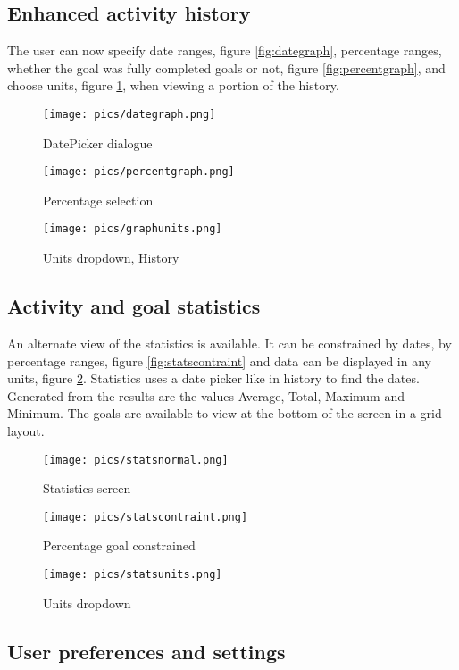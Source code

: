 \documentclass[12pt]{report}
\begin{document}
\subsection{Enhanced activity history}

The user can now specify date ranges, figure \ref{fig:dategraph}, percentage ranges, whether the goal was fully completed goals or not, figure \ref{fig:percentgraph}, and choose units, figure \ref{fig:graphunits}, when viewing a portion of the history. 

\begin{figure}[!htb]
  \texttt{[image: pics/dategraph.png]}
  \caption{DatePicker dialogue}
  \label{fig:dategraph}
\endminipage\hfill
{}
  \texttt{[image: pics/percentgraph.png]}
  \caption{Percentage selection}\label{fig:percentgraph}
\endminipage\hfill
{}
  \texttt{[image: pics/graphunits.png]}
  \caption{Units dropdown, History}\label{fig:graphunits}
\endminipage
\end{figure}

\subsection{Activity and goal statistics}

An alternate view of the statistics is available. It can be constrained by dates, by percentage ranges, figure \ref{fig:statscontraint} and data can be displayed in any units, figure \ref{fig:statsunits}. Statistics uses a date picker like in history to find the dates. Generated from the results are the values Average, Total, Maximum and Minimum. The goals are available to view at the bottom of the screen in a grid layout. 

\begin{figure}[!htb]
  \texttt{[image: pics/statsnormal.png]}
  \caption{Statistics screen}
  \label{fig:statsnormal}
\endminipage\hfill
{}
  \texttt{[image: pics/statscontraint.png]}
  \caption{Percentage goal constrained}\label{fig:statscontraint}
\endminipage\hfill
{}%
  \texttt{[image: pics/statsunits.png]}
  \caption{Units dropdown}\label{fig:statsunits}
\endminipage
\end{figure}

\subsection{User preferences and settings}
\end{document}
